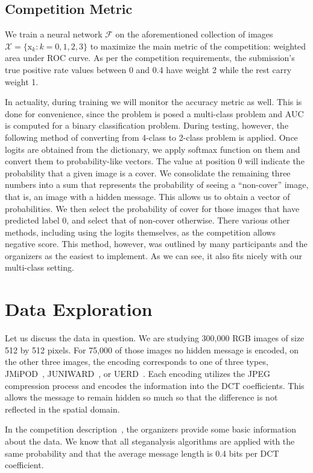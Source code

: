 \documentclass[letterpaper]{article}
\newcommand{\F}{\mathcal{F}}
\newcommand{\X}{\mathcal{X}}
\newcommand{\xvec}{\mathrm{x}}
\begin{document}
\subsection{Competition Metric}
We train a neural network \( \F \) on the aforementioned collection of images \( \X = \{ \xvec_k: k=0,1,2,3 \} \) to maximize the main metric of the competition: weighted area under ROC curve. As per the competition requirements, the submission's true positive rate values between 0 and 0.4 have weight 2 while the rest carry weight 1.

In actuality, during training we will monitor the accuracy metric as well. This is done for convenience, since the problem is posed a multi-class problem and AUC is computed for a binary classification problem. During testing, however, the following method of converting from 4-class to 2-class problem is applied. Once logits are obtained from the dictionary, we apply softmax function on them and convert them to probability-like vectors. The value at position 0 will indicate the probability that a given image is a cover. We consolidate the remaining three numbers into a sum that represents the probability of seeing a ``non-cover'' image, that is, an image with a hidden message. This allows us to obtain a vector of probabilities. We then select the probability of cover for those images that have predicted label 0, and select that of non-cover otherwise. There various other methods, including using the logits themselves, as the competition allows negative score. This method, however, was outlined by many participants and the organizers as the easiest to implement. As we can see, it also fits nicely with our multi-class setting.

\section{Data Exploration}

Let us discuss the data in question. We are studying 300,000 RGB images of size 512 by 512 pixels. For 75,000 of those images no hidden message is encoded, on the other three images, the encoding corresponds to one of three types, JMiPOD~\cite{jmipod}, JUNIWARD~\cite{juniward}, or UERD~\cite{uerd}. Each encoding utilizes the JPEG compression process and encodes the information into the DCT coefficients. This allows the message to remain hidden so much so that the difference is not reflected in the spatial domain.

In the competition description~\cite{alaska2}, the organizers provide some basic information about the data. We know that all steganalysis algorithms are applied with the same probability and that the average message length is 0.4 bits per DCT coefficient.
\end{document}
